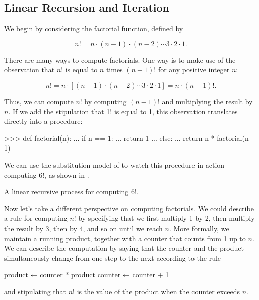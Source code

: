 \subsection{Linear Recursion and Iteration}
\label{Section 1.2.1}

We begin by considering the factorial function, defined by

$$n! = n \cdot (n - 1) \cdot (n - 2) \cdots 3 \cdot 2 \cdot 1.$$

There are many ways to compute factorials.  One way is to make use of the
observation that \( n! \) is equal to \( n \) times \( (n - 1)! \) for any positive
integer \( n \):

$$n! = n \cdot [(n - 1) \cdot (n - 2) \cdots 3 \cdot 2 \cdot 1] = n \cdot (n - 1)!.$$

Thus, we can compute \( n! \) by computing \( (n - 1)! \) and multiplying the
result by \( n \).  If we add the stipulation that 1! is equal to 1, this
observation translates directly into a procedure:

\begin{codeBlock}
>>> def factorial(n):
...     if n == 1:
...         return 1
...     else:
...         return n * factorial(n - 1)
\end{codeBlock}

\noindent
We can use the substitution model of  to watch this
procedure in action computing 6!, as shown in .

\begin{imageFigure}{A linear recursive process for computing 6!.}
  
\end{imageFigure}

Now let's take a different perspective on computing factorials.  We could
describe a rule for computing \( n! \) by specifying that we first multiply 1 by
2, then multiply the result by 3, then by 4, and so on until we reach \( n \).
More formally, we maintain a running product, together with a counter that
counts from 1 up to \( n \).  We can describe the computation by saying that the
counter and the product simultaneously change from one step to the next
according to the rule

\begin{syntaxForm}
product ← counter * product
counter ← counter + 1
\end{syntaxForm}

\noindent
and stipulating that \( n! \) is the value of the product when the counter
exceeds \( n \).

